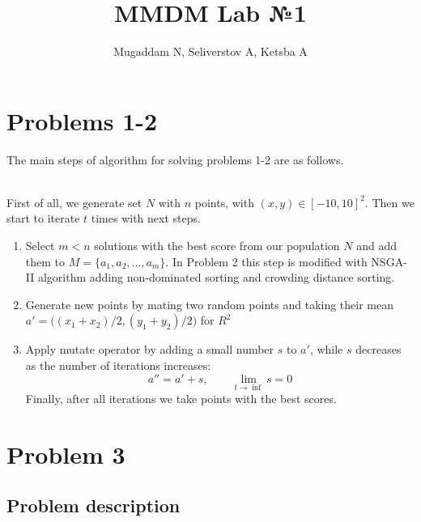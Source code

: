 \documentclass{article}
\title{MMDM Lab №1}
\author {Mugaddam N, Seliverstov A, Ketsba A}
\begin{document}
\maketitle

\section{Problems 1-2 }
The main steps of algorithm for solving problems 1-2 are as follows.

\\First of all, we generate set $N$ with $n$ points, with $(x,y) \in [-10,10]^2$. Then we start to iterate $t$ times with next steps.
\begin{enumerate}
\item Select $m < n$ solutions with the best score from our population $N$ and add them to $ M =  \{a_1,a_2,...,a_m\}$. In Problem 2 this step is modified with NSGA-II algorithm adding non-dominated sorting and crowding distance sorting. 
\item Generate new points by mating two random points and taking their mean  $a' = \big( {(x_1 + x_2)}/2 , {(y_1 + y_2)}/2 \big)$ for $R^2$
\item Apply mutate operator by adding a small number $s$ to $a'$, while $s$ decreases as the number of iterations increases:
    \begin{equation*} 
    a'' = a' + s, \qquad \lim_{t \to \inf} s = 0
    \end{equation*}
Finally, after all iterations we take points with the best scores.
\end{enumerate}

\section{Problem 3}
\subsection{Problem description}
\end{document}
